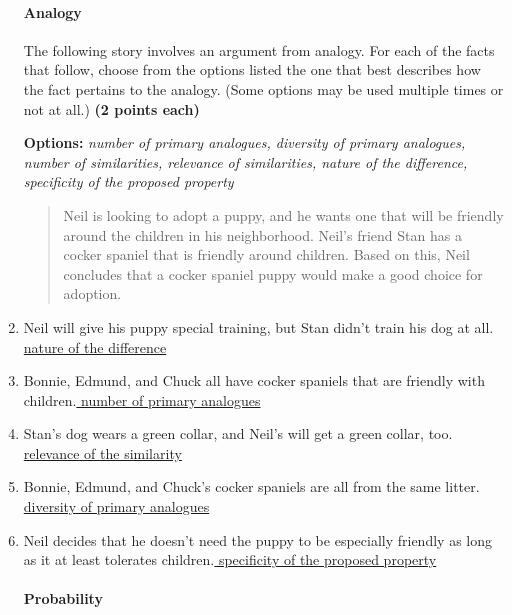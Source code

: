 \documentclass[10pt]{article}
\begin{document}
\begin{enumerate}
\paragraph{Analogy}

The following story involves an argument from analogy.  For each of the facts that follow, choose from the options listed the one that best describes how the fact pertains to the analogy. (Some options may be used multiple times or not at all.) \textbf{(2 points each)}

\begin{center}\textbf{Options:} \textit{number of primary analogues, diversity of primary analogues, number of similarities, relevance of similarities, nature of the difference, specificity of the proposed property} \end{center}

\begin{quote}
  Neil is looking to adopt a puppy, and he wants one that will be friendly around the children in his neighborhood. Neil's friend Stan has a cocker spaniel that is friendly around children.  Based on this, Neil concludes that a cocker spaniel puppy would make a good choice for adoption.
\end{quote}

\setlength\itemsep{5mm}

\item Neil will give his puppy special training, but Stan didn't train his dog at all.\underline{ nature of the difference }

\item Bonnie, Edmund, and Chuck all have cocker spaniels that are friendly with children.\underline{ number of primary analogues }

\item Stan's dog wears a green collar, and Neil's will get a green collar, too. \underline{ relevance of the similarity }

\item Bonnie, Edmund, and Chuck's cocker spaniels are all from the same litter.\underline{ diversity of primary analogues }

\item Neil decides that he doesn't need the puppy to be especially friendly as long as it at least tolerates children.\underline{ specificity of the proposed property }


\paragraph{Probability}


\end{enumerate}
\end{document}

